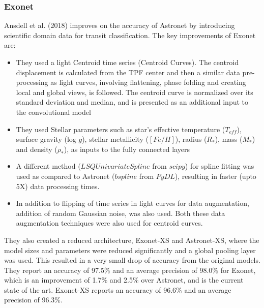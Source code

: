 \subsubsection{Exonet}
Ansdell et al. (2018) \cite{exonet} improves on the accuracy of Astronet by introducing scientific domain data for transit classification. The key improvements of Exonet are:
\begin{itemize}
    \item They used a light Centroid time series (Centroid Curves). The centroid displacement is calculated from the TPF center and then a similar data pre-processing as light curves, involving flattening, phase folding and creating local and global views, is followed. The centroid curve is normalized over its standard deviation and median, and is presented as an additional input to the convolutional model
    \item They used Stellar parameters such as star's effective temperature ($T_{eff}$), surface gravity (log $g$), stellar metallicity ($[Fe/H]$), radius ($R_{*}$), mass ($M_*$) and density ($\rho_*$), as inputs to the fully connected layers
    \item A different method ($LSQUnivariateSpline$ from $scipy$) for spline fitting was used as compared to Astronet ($bspline$ from $PyDL$), resulting in faster (upto 5X) data processing times.
    \item In addition to flipping of time series in light curves for data augmentation, addition of random Gaussian noise, was also used. Both these data augmentation techniques were also used for centroid curves.
\end{itemize}
They also created a reduced architecture, Exonet-XS and Astronet-XS, where the model sizes and parameters were reduced significantly and a global pooling layer was used. This resulted in a very small drop of accuracy from the original models. They report an accuracy of 97.5\% and an average precision of 98.0\% for Exonet, which is an improvement of 1.7\% and 2.5\% over Astronet, and is the current state of the art. Exonet-XS reports an accuracy of 96.6\% and an average precision of 96.3\%.

